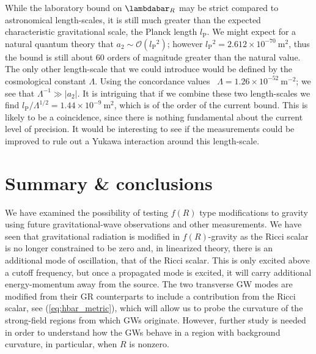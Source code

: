\documentclass[aps,prd,amsfonts,amssymb,amsmath,nofootinbib,reprint,showpacs]{revtex4-1}
\newcommand{\eqnref}[1]{(\ref{eq:#1})}
\newcommand{\units}[1]{\ensuremath{~\mathrm{#1}}}
\newcommand{\sub}[1]{\ensuremath{_\text{#1}}}
\newcommand{\order}[1]{\ensuremath{\mathcal{O}({#1})}}
\begin{document}
While the laboratory bound on $\lambdabar_R$ may be strict compared to astronomical length-scales, it is still much greater than the expected characteristic gravitational scale, the Planck length $l\sub{P}$. We might expect for a natural quantum theory that $a_2 \sim \order{l\sub{P}^2}$; however $l\sub{P}^2 = 2.612 \times 10^{-70}\units{m^2}$, thus the bound is still about $60$ orders of magnitude greater than the natural value. The only other length-scale that we could introduce would be defined by the cosmological constant $\Lambda$. Using the concordance values~\cite{Jarosik2011} $\Lambda = 1.26 \times 10^{-52}\units{m^{-2}}$; we see that $\Lambda^{-1} \gg |a_2|$. It is intriguing that if we combine these two length-scales we find ${l\sub{P}}/{\Lambda^{1/2}} = 1.44 \times 10^{-9}\units{m^2}$, which is of the order of the current bound. This is likely to be a coincidence, since there is nothing fundamental about the current level of precision. It would be interesting to see if the measurements could be improved to rule out a Yukawa interaction around this length-scale.

\section{Summary \& conclusions\label{sec:f_Discuss}}

We have examined the possibility of testing $f(R)$ type modifications to gravity using future gravitational-wave observations and other measurements. We have seen that gravitational radiation is modified in $f(R)$-gravity as the Ricci scalar is no longer constrained to be zero and, in linearized theory, there is an additional mode of oscillation, that of the Ricci scalar. This is only excited above a cutoff frequency, but once a propagated mode is excited, it will carry additional energy-momentum away from the source. The two transverse GW modes are modified from their GR counterparts to include a contribution from the Ricci scalar, see \eqnref{hbar_metric}, which will allow us to probe the curvature of the strong-field regions from which GWs originate. However, further study is needed in order to understand how the GWs behave in a region with background curvature, in particular, when $R$ is nonzero.
\end{document}
